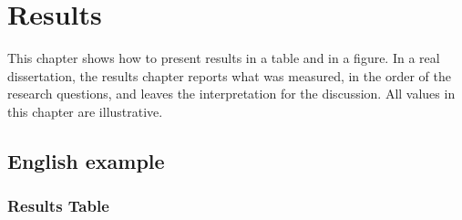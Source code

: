 \chapter{Results}
\label{chap:results}

This chapter shows how to present results in a table and in a figure. In a
real dissertation, the results chapter reports what was measured, in the
order of the research questions, and leaves the interpretation for the
discussion. All values in this chapter are illustrative.

\section{English example}
\label{sec:results:en}

\subsection{Results Table}
\label{sec:results:table}

